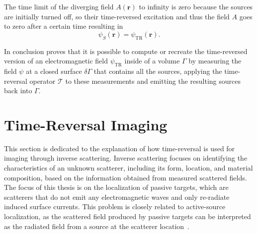 The time limit of the diverging field \(A(\bm{r})\) to infinity is zero because the sources are initially turned off, so their time-reversed excitation and thus the field \(A\) goes to zero after a certain time resulting in
\begin{equation}
    \psi_S(\bm{r}) = \psi_{\text{TR}}(\bm{r}).
\end{equation}

In conclusion \parencite{de_rosny_theory_2010} proves that it is possible to compute or recreate the time-reversed version of an electromagnetic field \(\psi_{\text{TR}}\) inside of a volume \(\Gamma \) by measuring the field \(\psi \) at a closed surface \(\delta \Gamma \) that contains all the sources, applying the time-reversal operator \(\mathcal{T}\) to these measurements and emitting the resulting sources back into \(\Gamma \).



\section{Time-Reversal Imaging}
This section is dedicated to the explanation of how time-reversal is used for imaging through inverse scattering.
Inverse scattering focuses on identifying the characteristics of an unknown scatterer, including its form, location, and material composition, based on the information obtained from measured scattered fields.
The focus of this thesis is on the localization of passive targets, which are scatterers that do not emit any electromagnetic waves and only re-radiate induced surface currents.
This problem is closely related to active-source localization, as the scattered field produced by passive targets can be interpreted as the radiated field from a source at the scatterer location~\parencite{chen_computational_2018}.

